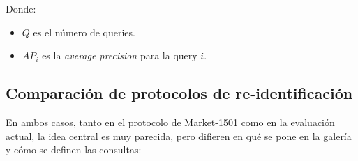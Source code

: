 \documentclass[12pt, a4paper, twoside]{article}
\begin{document}
	Donde:
	
	\begin{itemize}
		\item $Q$ es el número de queries.
		\item $AP_i$ es la \textit{average precision} para la query $i$.
	\end{itemize}
	
 	\subsection{Comparación de protocolos de re-identificación} \cite{7410490}
 	
 	En ambos casos, tanto en el protocolo de Market-1501 como en la evaluación actual, la idea central es muy parecida, pero difieren en qué se pone en la galería y cómo se definen las consultas:
 	
\end{document}
